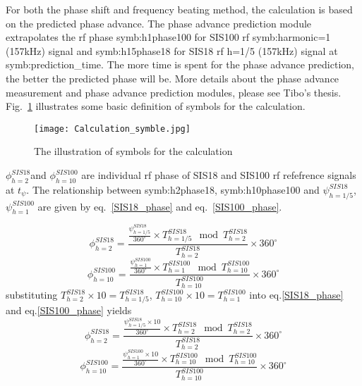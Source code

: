 For both the phase shift and frequency beating method, the calculation is based on the predicted phase advance. The phase advance prediction module extrapolates the rf phase \gls{symb:h1phase100} for SIS100 rf \gls{symb:harmonic}=1 (157kHz) signal and \gls{symb:h15phase18} for SIS18 rf h=1/5 (157kHz) signal at \gls{symb:prediction_time}. The more time is spent for the phase advance prediction, the better the predicted phase will be. More details about the phase advance measurement and phase advance prediction modules, please see Tibo's thesis. Fig.~\ref{Calculation_symble} illustrates some basic definition of symbols for the calculation. 
\begin{figure}[!htb]
   \centering   
   \texttt{[image: Calculation\_symble.jpg]}
   \caption{The illustration of symbols for the calculation}
   \label{Calculation_symble}
\end{figure}
$\phi_{h=2}^{SIS18}$and $\phi_{h=10}^{SIS100}$ are individual rf phase of SIS18 and SIS100 rf refefrence signals at $t_{\psi}$. The relationship between \gls{symb:h2phase18}, \gls{symb:h10phase100} and $\psi_{h=1/5}^{SIS18}$, $\psi_{h=1}^{SIS100}$ are given by eq.~\ref{SIS18_phase} and eq.~\ref{SIS100_phase}. 

\begin{equation}
\phi_{h=2}^{SIS18} =  \frac {\frac{\psi_{h=1/5}^{SIS18}}{360^\circ}\times {T_{h=1/5}^{SIS18}} \mod {T_{h=2}^{SIS18}}}{T_{h=2}^{SIS18}}\times {360^\circ} \label{SIS18_phase}
\end{equation}
\begin{equation}
\phi_{h=10}^{SIS100} =  \frac {\frac{\psi_{h=1}^{SIS100}}{360^\circ}\times {T_{h=1}^{SIS100}} \mod {T_{h=10}^{SIS100}}}{T_{h=10}^{SIS100}}\times {360^\circ} \label{SIS100_phase}
\end{equation}
substituting $T_{h=2}^{SIS18}\times 10=T_{h=1/5}^{SIS18}$, $T_{h=10}^{SIS100}\times 10=T_{h=1}^{SIS100}$ into eq.\ref{SIS18_phase} and eq.\ref{SIS100_phase} yields
 \begin{equation}
\phi_{h=2}^{SIS18} =  \frac {\frac{\psi_{h=1/5}^{SIS18}\times 10}{360^\circ}\times {T_{h=2}^{SIS18}} \mod {T_{h=2}^{SIS18}}}{T_{h=2}^{SIS18}}\times {360^\circ} \label{SIS18_phase1}
\end{equation}
\begin{equation}
\phi_{h=10}^{SIS100} =  \frac {\frac{\psi_{h=1}^{SIS100}\times 10}{360^\circ}\times {T_{h=10}^{SIS100}} \mod {T_{h=10}^{SIS100}}}{T_{h=10}^{SIS100}}\times {360^\circ} \label{SIS100_phase1}
\end{equation}

